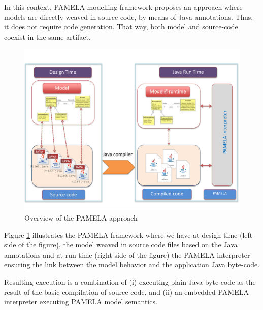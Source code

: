 In this context, PAMELA modelling framework proposes an approach where models are directly weaved in source code, by means of Java annotations. Thus, it does not require code generation. That way, both model and source-code coexist in the same artifact. 

\begin{figure}
    \centering
    \includegraphics[width=1.0 \columnwidth]{utils/PamelaVisionV2.pdf}
    \caption{Overview of the PAMELA approach}
    \label{fig:PamelaVision}
\end{figure}

Figure \ref{fig:PamelaVision} illustrates the PAMELA framework where we have at design time (left side of the figure), the model weaved in source code files based on the Java annotations and at run-time (right side of the figure) the PAMELA interpreter ensuring the link between the model behavior and the application Java byte-code.

Resulting execution is a combination of (i) executing plain Java byte-code as the result of the basic compilation of source code, and (ii) an embedded PAMELA interpreter executing PAMELA model semantics.
 
